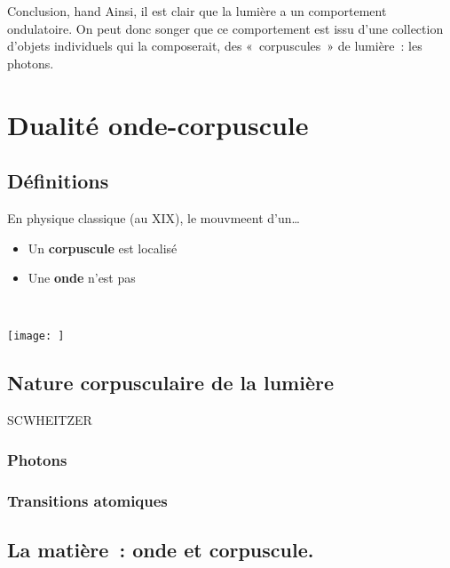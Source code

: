 \documentclass[../main/main.tex]{subfiles}
\begin{document}
\begin{tror}{Conclusion, hand}
	Ainsi, il est clair que la lumière a un comportement ondulatoire. On peut donc
	songer que ce comportement est issu d'une collection d'objets individuels qui
	la composerait, des «~corpuscules~» de lumière~: les photons.
\end{tror}

\section{Dualité onde-corpuscule}
\label{sec:dualondcorp}

\subsection{Définitions}
\label{ssec:docdef}
\noindent
\begin{minipage}[t]{.45\linewidth}
	En physique classique (au \textsc{XIX}\ieme), le mouvmeent d'un…
	\begin{itemize}
		\item Un \textbf{corpuscule} est localisé
		\item Une \textbf{onde} n'est pas
	\end{itemize}

\end{minipage}
\hfill
\begin{minipage}[t]{.\linewidth}
	~
	\begin{center}
		\texttt{[image: ]}

		\label{fig:fig1}
	\end{center}
\end{minipage}



\subsection{Nature corpusculaire de la lumière}
\label{ssec:lumcorp}
SCWHEITZER
\subsubsection{Photons}
\label{sssec:photons}
\subsubsection{Transitions atomiques}
\label{sssec:transatom}

\subsection{La matière~: onde et corpuscule.}
\label{ssec:matonde}
\end{document}
